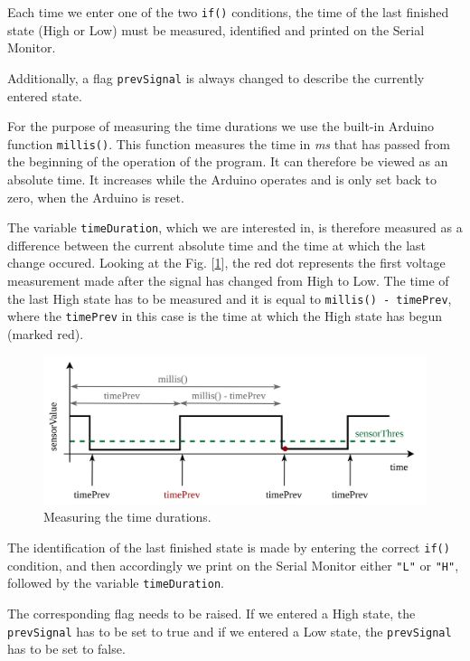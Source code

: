 \documentclass[12pt]{report}
\begin{document}
Each time we enter one of the two \verb|if()| conditions, the time of the last finished state (High or Low) must be measured, identified and printed on the Serial Monitor.

Additionally, a flag \verb|prevSignal| is always changed to describe the currently entered state.

For the purpose of measuring the time durations we use the built-in Arduino function \verb|millis()|. This function measures the time in \textit{ms} that has passed from the beginning of the operation of the program. It can therefore be viewed as an absolute time. It increases while the Arduino operates and is only set back to zero, when the Arduino is reset.

The variable \verb|timeDuration|, which we are interested in, is therefore measured as a difference between the current absolute time and the time at which the last change occured. Looking at the Fig. [\ref{fig:timedur}], the red dot represents the first voltage measurement made after the signal has changed from High to Low. The time of the last High state has to be measured and it is equal to \verb|millis() - timePrev|, where the 
\verb|timePrev| in this case is the time at which the High state has begun (marked red).


\begin{figure}[H]
\centering\includegraphics[scale=0.18]{timedurations}
\caption{Measuring the time durations.}				
\label{fig:timedur}
\end{figure}

The identification of the last finished state is made by entering the correct \verb|if()| condition, and then accordingly we print on the Serial Monitor either \verb|"L"| or \verb|"H"|, followed by the variable \verb|timeDuration|.

The corresponding flag needs to be raised. If we entered a High state, the \verb|prevSignal| has to be set to true and if we entered a Low state, the \verb|prevSignal| has to be set to false.
\end{document}
